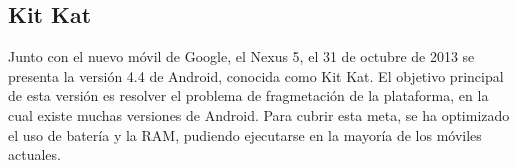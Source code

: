 \subsection{Kit Kat}

Junto con el nuevo móvil de Google, el Nexus 5, el 31 de octubre de 2013 se presenta la versión 4.4 de Android, conocida como Kit Kat.  El objetivo principal de esta versión es resolver el problema de fragmetación de la plataforma, en la cual existe muchas versiones de Android. Para cubrir esta meta, se ha optimizado el uso de batería y la RAM, pudiendo ejecutarse en la mayoría de los móviles actuales.

